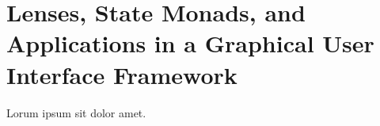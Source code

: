 \section{Lenses, State Monads, and Applications in a Graphical User Interface Framework}


Lorum ipsum sit dolor amet.  \lipsum[2-4]